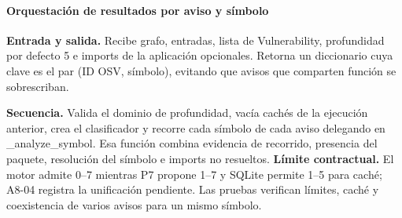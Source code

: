 \paragraph*{Orquestación de resultados por aviso y símbolo}
\textbf{Entrada y salida.} Recibe grafo, entradas, lista de Vulnerability, profundidad por defecto 5 e imports de la aplicación opcionales. Retorna un diccionario cuya clave es el par (ID OSV, símbolo), evitando que avisos que comparten función se sobrescriban.
\par\begingroup{}
\noindent\begin{minipage}{\textwidth}

\end{minipage}
\endgroup
{}
\textbf{Secuencia.} Valida el dominio de profundidad, vacía cachés de la ejecución anterior, crea el clasificador y recorre cada símbolo de cada aviso delegando en \_analyze\_symbol. Esa función combina evidencia de recorrido, presencia del paquete, resolución del símbolo e imports no resueltos. \textbf{Límite contractual.} El motor admite 0--7 mientras P7 propone 1--7 y SQLite permite 1--5 para caché; A8-04 registra la unificación pendiente. Las pruebas verifican límites, caché y coexistencia de varios avisos para un mismo símbolo.
